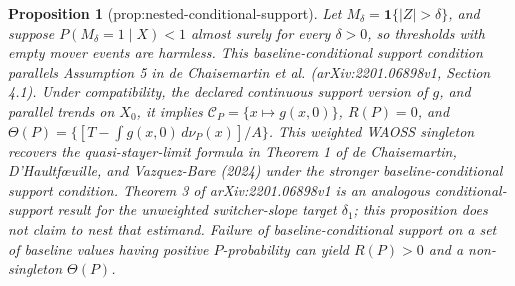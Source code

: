 \documentclass{article}
\newtheorem{proposition}{Proposition}
\begin{document}
\begin{proposition}[prop:nested-conditional-support]\label{prop:nested-conditional-support}
Let \(M_{\delta}=\mathbf 1\{|Z|>\delta\}\), and suppose \(P(M_{\delta}=1\mid X)<1\) almost surely for every \(\delta>0\), so thresholds with empty mover events are harmless. This baseline-conditional support condition parallels Assumption 5 in de Chaisemartin et al. (arXiv:2201.06898v1, Section 4.1). Under compatibility, the declared continuous support version of \(g\), and parallel trends on \(X_0\), it implies \(\mathcal C_P=\{x\mapsto g(x,0)\}\), \(R(P)=0\), and \(\Theta(P)=\{[T-\int g(x,0)\,d\nu_P(x)]/A\}\). This weighted WAOSS singleton recovers the quasi-stayer-limit formula in Theorem 1 of de Chaisemartin, D'Haultf\oe{}uille, and Vazquez-Bare (2024) under the stronger baseline-conditional support condition. Theorem 3 of arXiv:2201.06898v1 is an analogous conditional-support result for the unweighted switcher-slope target \(\delta_1\); this proposition does not claim to nest that estimand. Failure of baseline-conditional support on a set of baseline values having positive \(P\)-probability can yield \(R(P)>0\) and a non-singleton \(\Theta(P)\).
\end{proposition}
\end{document}
